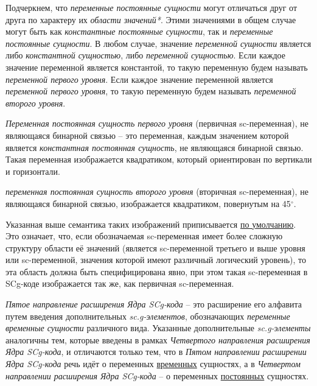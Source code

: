 Подчеркнем, что \textit{переменные постоянные сущности} могут отличаться друг от друга по характеру их \textit{области значений*}. Этими значениями в общем случае могут быть как \textit{константные постоянные сущности}, так и \textit{переменные постоянные сущности}. В любом случае, значение \textit{переменной сущности} является либо \textit{константной сущностью}, либо \textit{переменной сущностью}. Если каждое значение переменной является константой, то такую переменную будем называть \textit{переменной первого уровня}. Если каждое значение переменной является \textit{переменной первого уровня}, то такую переменную будем называть \textit{переменной второго уровня}. 

\textit{Переменная постоянная сущность первого уровня } (первичная sc-переменная), не являющаяся бинарной связью -- это переменная, каждым значением которой является \textit{константная постоянная сущность}, не являющаяся бинарной связью. Такая переменная изображается квадратиком, который ориентирован по вертикали и горизонтали. 

\textit{переменная постоянная сущность второго уровня} (вторичная sc-переменная), не являющаяся бинарной связью, изображается квадратиком, повернутым на 45$^\circ$. 

Указанная выше семантика таких изображений приписывается \uline{по умолчанию}. Это означает, что, если обозначаемая sc-переменная имеет более сложную структуру области её значений (является sc-переменной третьего и выше уровня или sc-переменной, значения которой имеют различный логический уровень), то эта область должна быть специфицирована явно, при этом такая sc-переменная в SCg-коде изображается так же, как первичная sc-переменная.

\begin{SCn}
\end{SCn}
	
\textit{Пятое направление расширения Ядра SCg-кода} -- это расширение его алфавита путем введения дополнительных \textit{sc.g-элементов}, обозначающих \textit{переменные временные сущности} различного вида. Указанные дополнительные \textit{sc.g-элементы} аналогичны тем, которые введены в рамках \textit{Четвертого направления расширения Ядра SCg-кода}, и отличаются только тем, что в \textit{Пятом направлении расширении Ядра SCg-кода} речь идёт о переменных \uline{временных} сущностях, а в \textit{Четвертом направлении расширения Ядра SCg-кода} -- о переменных \uline{постоянных} сущностях.

